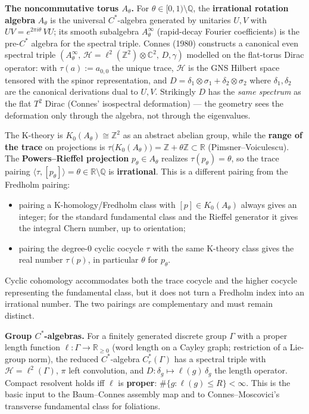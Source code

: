 \documentclass[
  11pt,
]{article}
\providecommand{\tightlist}{%
  \setlength{\itemsep}{0pt}\setlength{\parskip}{0pt}}
\begin{document}
\textbf{The noncommutative torus \(A_\theta\).} For
\(\theta \in [0, 1) \setminus \mathbb{Q}\), the \textbf{irrational
rotation algebra} \(A_\theta\) is the universal \(C^*\)-algebra
generated by unitaries \(U, V\) with \(UV = e^{2\pi i \theta}\,VU\); its
smooth subalgebra \(A_\theta^\infty\) (rapid-decay Fourier coefficients)
is the pre-\(C^*\) algebra for the spectral triple. Connes (1980)
constructs a canonical even spectral triple
\((A_\theta^\infty,\, \mathcal{H}= \ell^2(\mathbb{Z}^2) \otimes \mathbb{C}^2,\, D, \gamma)\)
modelled on the flat-torus Dirac operator: with \(\tau(a) := a_{0,0}\)
the unique trace, \(\mathcal{H}\) is the GNS Hilbert space tensored with
the spinor representation, and
\(D = \delta_1 \otimes \sigma_1 + \delta_2 \otimes \sigma_2\) where
\(\delta_1, \delta_2\) are the canonical derivations dual to \(U, V\).
Strikingly \(D\) has the \emph{same spectrum} as the flat \(T^2\) Dirac
(Connes' isospectral deformation) --- the geometry sees the deformation
only through the algebra, not through the eigenvalues.

The K-theory is \(K_0(A_\theta) \cong \mathbb{Z}^2\) as an
abstract abelian group, while the \textbf{range of the trace} on
projections is
\(\tau\bigl(K_0(A_\theta)\bigr) = \mathbb{Z}+ \theta\mathbb{Z}\subset \mathbb{R}\)
(Pimsner--Voiculescu). The \textbf{Powers--Rieffel projection}
\(p_\theta \in A_\theta\) realizes \(\tau(p_\theta) = \theta\), so the
trace pairing
\(\langle \tau, [p_\theta]\rangle = \theta \in \mathbb{R}\setminus \mathbb{Q}\)
is \textbf{irrational}. This is a different pairing from the Fredholm
pairing:

\begin{itemize}
\tightlist
\item
  pairing a K-homology/Fredholm class with \([p]\in K_0(A_\theta)\)
  always gives an integer; for the standard fundamental class and the
  Rieffel generator it gives the integral Chern number, up to orientation;
\item
  pairing the degree-0 cyclic cocycle \(\tau\) with the same K-theory
  class gives the real number \(\tau(p)\), in particular \(\theta\) for
  \(p_\theta\).
\end{itemize}

Cyclic cohomology accommodates both the trace cocycle and the higher
cocycle representing the fundamental class, but it does not turn a
Fredholm index into an irrational number. The two pairings are
complementary and must remain distinct.

\textbf{Group \(C^*\)-algebras.} For a finitely generated discrete group
\(\Gamma\) with a proper length function
\(\ell\colon \Gamma \to \mathbb{R}_{\geq 0}\) (word length on a Cayley
graph; restriction of a Lie-group norm), the reduced \(C^*\)-algebra
\(C^*_r(\Gamma)\) has a spectral triple with
\(\mathcal{H}= \ell^2(\Gamma)\), \(\pi\) left convolution, and
\(D\colon \delta_g \mapsto \ell(g)\,\delta_g\) the length operator.
Compact resolvent holds iff \(\ell\) is \textbf{proper}:
\(\#\{g : \ell(g) \leq R\} < \infty\). This is the basic input to the
Baum--Connes assembly map and to Connes--Moscovici's transverse
fundamental class for foliations.
\end{document}
